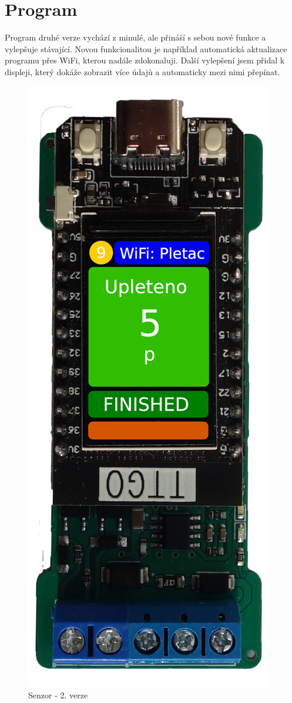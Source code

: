 \section{Program}
Program druhé verze vychází z minulé, ale přináší s sebou nové funkce a vylepšuje stávající.
Novou funkcionalitou je například automatická aktualizace programu přes WiFi, kterou nadále zdokonaluji.
Další vylepšení jsem přidal k displeji, který dokáže zobrazit více údajů a automaticky mezi nimi přepínat.

\begin{figure}[htbp]
    \centering
    \includegraphics[scale=0.3]{img/V2-deska-esp-screen.png}
    \caption{Senzor - 2. verze}
    \label{fig:SenzorV2}
\end{figure}


\newpage